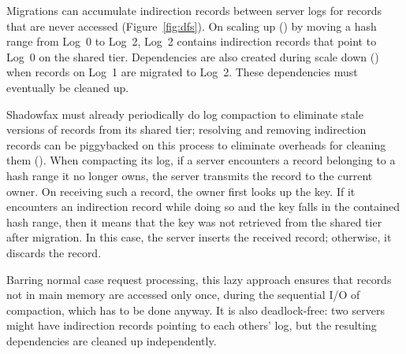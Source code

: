 Migrations can accumulate indirection records between server logs
for records that are never accessed (Figure~\ref{fig:dfs}).
%
On scaling up (\one) by moving a hash range from
Log~0 to Log~2, Log~2 contains indirection records that point to
Log~0 on the shared tier.
%
Dependencies are also created during scale down (\two) when
records on Log~1 are migrated to Log~2.
%
These dependencies must eventually be cleaned up.

Shadowfax must already periodically do log compaction to eliminate stale
versions of records from its shared tier; resolving and removing indirection
records can be piggybacked on this process to eliminate overheads for
cleaning them (\three).
%
When compacting its log, if a server encounters a record belonging to a
hash range it no longer owns, the server transmits the record to the
current owner.
%
On receiving such a record, the owner first looks up the key.
%
If it encounters an indirection record while doing so and the key falls
in the contained hash range, then it means that the key was not retrieved
from the shared tier after migration.
%
In this case, the server inserts the received record; otherwise, it discards
the record.

Barring normal case request processing, this lazy approach
ensures that records not in main memory are accessed only once, during
the sequential I/O of compaction, which has to be done anyway.
%
It is also deadlock-free:
%
two servers might have indirection records pointing to each others' log,
but the resulting dependencies are cleaned up independently.
